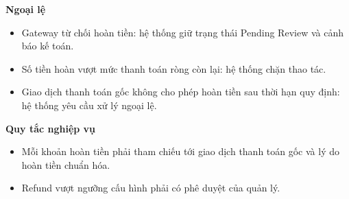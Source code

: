 \documentclass[11pt,a4paper]{article}
\begin{document}
\begin{usecasebox}[title={UC-PAY-03 --- Hoàn tiền}]
    \textbf{Ngoại lệ}
    \begin{itemize}[leftmargin=1.8em]
  \item Gateway từ chối hoàn tiền: hệ thống giữ trạng thái \textsf{Pending Review} và cảnh báo kế toán.
  \item Số tiền hoàn vượt mức thanh toán ròng còn lại: hệ thống chặn thao tác.
  \item Giao dịch thanh toán gốc không cho phép hoàn tiền sau thời hạn quy định: hệ thống yêu cầu xử lý ngoại lệ.
\end{itemize}

    \textbf{Quy tắc nghiệp vụ}
    \begin{itemize}[leftmargin=1.8em]
  \item Mỗi khoản hoàn tiền phải tham chiếu tới giao dịch thanh toán gốc và lý do hoàn tiền chuẩn hóa.
  \item Refund vượt ngưỡng cấu hình phải có phê duyệt của quản lý.
\end{itemize}
    \end{usecasebox}
\end{document}
